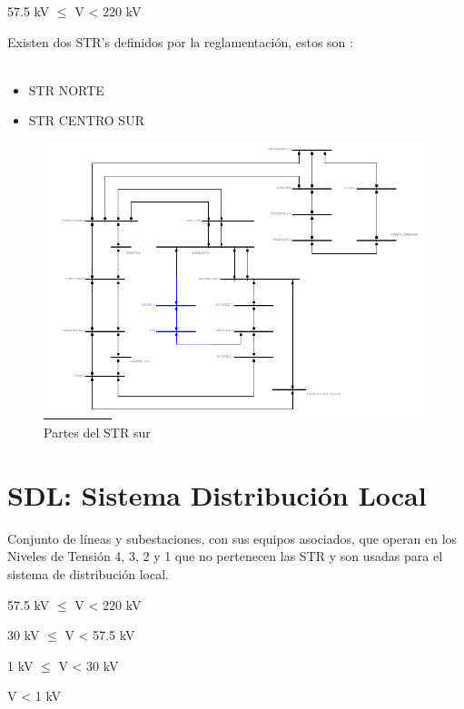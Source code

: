 \documentclass[a5paper]{book}%
\begin{document}
\begin{center}

  \begin{tcolorbox}[ title=STR:Nivel de tensión 4]
    {57.5 kV $\leq$ V < 220 kV }
\end{tcolorbox}
\end{center}

Existen dos \ac{STR}'s definidos por la reglamentación, estos son
:\\\\

\begin{itemize}
\item STR NORTE
\item STR CENTRO SUR
\end{itemize}

\begin{figure}[H]
  \caption{Partes del STR sur}
  \includegraphics[width=\linewidth]{str}
\end{figure}
\section{SDL: Sistema Distribución Local}
Conjunto de líneas y subestaciones, con sus equipos asociados, que operan en los Niveles de Tensión 4, 3, 2 y 1 que no pertenecen las \ac{STR} y son usadas para el sistema de distribución local.

\begin{center}

  \begin{tcolorbox}[ title=SDL:Nivel de tensión 4]
    {57.5 kV $\leq$ V < 220 kV }
\end{tcolorbox}

  \begin{tcolorbox}[ title=SDL:Nivel de tensión 3]
    {30 kV $\leq$ V < 57.5 kV }
\end{tcolorbox}
\begin{tcolorbox}[ title=SDL:Nivel de tensión 2]
  { 1 kV $\leq$ V < 30 kV }
  \end{tcolorbox}
\begin{tcolorbox}[ title=SDL:Nivel de tensión 1]
  { V < 1 kV }
  \end{tcolorbox}
\end{center}
\end{document}
